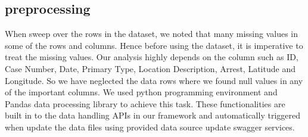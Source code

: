 \subsection{preprocessing}
When sweep over the rows in the dataset, we noted that many missing
values in some of the rows and columns. Hence before using the
dataset, it is imperative to treat the missing values. Our analysis
highly depends on the column such as ID, Case Number, Date, Primary
Type, Location Description, Arrest, Latitude and Longitude. So we have
neglected the data rows where we found null values in any of the
important columns. We used python programming environment and Pandas
data processing library to achieve this task. These functionalities
are built in to the data handling APIs in our framework and
automatically triggered when update the data files using provided data
source update swagger services.

